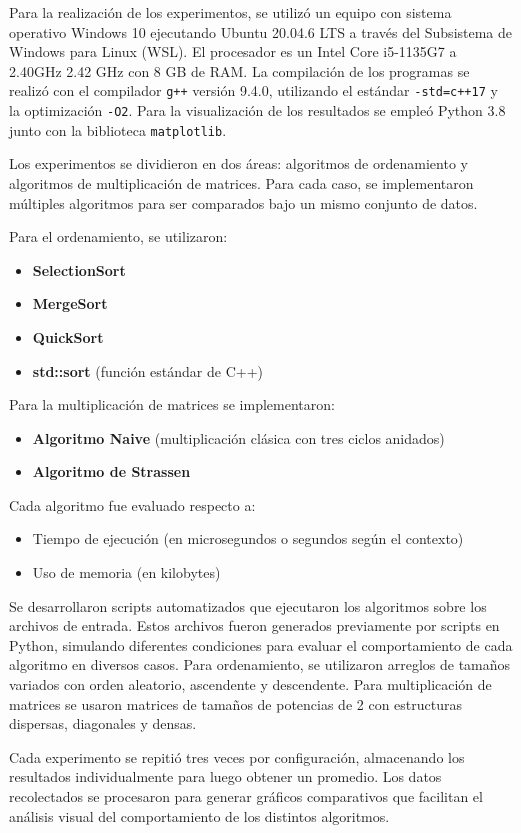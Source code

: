Para la realización de los experimentos, se utilizó un equipo con sistema operativo Windows 10 ejecutando Ubuntu 20.04.6 LTS a través del Subsistema de Windows para Linux (WSL). El procesador es un Intel Core i5-1135G7 a 2.40GHz   2.42 GHz con 8 GB de RAM. La compilación de los programas se realizó con el compilador \texttt{g++} versión 9.4.0, utilizando el estándar \texttt{-std=c++17} y la optimización \texttt{-O2}. Para la visualización de los resultados se empleó Python 3.8 junto con la biblioteca \texttt{matplotlib}.

Los experimentos se dividieron en dos áreas: algoritmos de ordenamiento y algoritmos de multiplicación de matrices. Para cada caso, se implementaron múltiples algoritmos para ser comparados bajo un mismo conjunto de datos.

Para el ordenamiento, se utilizaron:
\begin{itemize}
  \item \textbf{SelectionSort}
  \item \textbf{MergeSort}
  \item \textbf{QuickSort}
  \item \textbf{std::sort} (función estándar de C++)
\end{itemize}

Para la multiplicación de matrices se implementaron:
\begin{itemize}
  \item \textbf{Algoritmo Naive} (multiplicación clásica con tres ciclos anidados)
  \item \textbf{Algoritmo de Strassen}
\end{itemize}

Cada algoritmo fue evaluado respecto a:
\begin{itemize}
  \item Tiempo de ejecución (en microsegundos o segundos según el contexto)
  \item Uso de memoria (en kilobytes)
\end{itemize}

Se desarrollaron scripts automatizados que ejecutaron los algoritmos sobre los archivos de entrada. Estos archivos fueron generados previamente por scripts en Python, simulando diferentes condiciones para evaluar el comportamiento de cada algoritmo en diversos casos. Para ordenamiento, se utilizaron arreglos de tamaños variados con orden aleatorio, ascendente y descendente. Para multiplicación de matrices se usaron matrices de tamaños de potencias de 2 con estructuras dispersas, diagonales y densas.

Cada experimento se repitió tres veces por configuración, almacenando los resultados individualmente para luego obtener un promedio. Los datos recolectados se procesaron para generar gráficos comparativos que facilitan el análisis visual del comportamiento de los distintos algoritmos.
